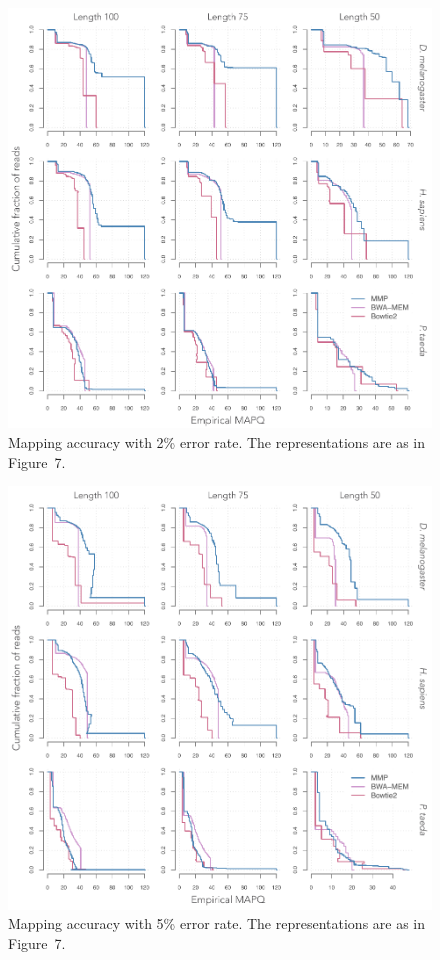 \documentclass{article}
\begin{document}
\begin{figure}
\begin{center}
\includegraphics[scale=.54]{accQ2_fig.pdf}
\end{center}
\caption{Mapping accuracy with 2\% error rate. The representations are
as in Figure~7.}
\end{figure}

\begin{figure}
\begin{center}
\includegraphics[scale=.54]{accQ5_fig.pdf}
\end{center}
\caption{Mapping accuracy with 5\% error rate. The representations are
as in Figure~7.}
\end{figure}
\end{document}
